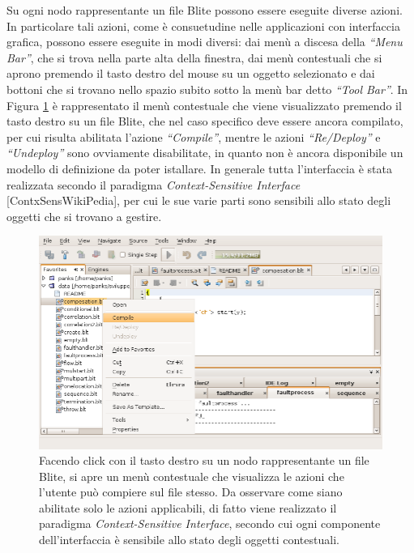 Su ogni nodo rappresentante un file Blite possono essere eseguite diverse
azioni. In particolare tali azioni, come è consuetudine nelle applicazioni con
interfaccia grafica, possono essere eseguite in modi diversi: dai menù a
discesa della \emph{``Menu Bar''}, che si trova nella parte alta della finestra,
dai menù contestuali che si aprono premendo il tasto destro del mouse su
un oggetto selezionato e dai bottoni che si trovano nello spazio subito sotto
la menù bar detto \emph{``Tool Bar''}. In Figura \ref{fig:blideCMenu} è rappresentato il
menù contestuale che viene visualizzato premendo il tasto destro su un file
Blite, che nel caso specifico deve essere ancora compilato, per cui risulta
abilitata l'azione \emph{``Compile''}, mentre le azioni \emph{``Re/Deploy''} e
\emph{``Undeploy''} sono ovviamente disabilitate, in quanto non è ancora
disponibile un modello di definizione da poter istallare. In generale
tutta l'interfaccia è stata realizzata secondo il paradigma
\emph{Context-Sensitive Interface} [ContxSensWikiPedia], per cui le sue
varie parti sono sensibili allo stato degli oggetti che si trovano a gestire.

\begin{figure}[t]
\begin{center}
\includegraphics[scale=0.70]
{blide/dia/BlideCMenu}
\caption[Menu Contestuale su di un File Blite]{Facendo click con il tasto destro
su un nodo rappresentante un file Blite, si apre un menù contestuale che
visualizza le azioni che l'utente può compiere sul file stesso. Da osservare
come siano abilitate solo le azioni applicabili, di fatto viene realizzato il
paradigma \emph{Context-Sensitive Interface}, secondo cui ogni componente
dell'interfaccia è sensibile allo stato degli oggetti contestuali.}
  \label{fig:blideCMenu}
\end{center}
\end{figure}


